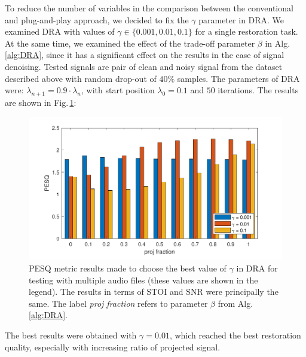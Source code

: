 \documentclass[conference]{IEEEtran}
\newcommand{\todo}[1]{\textcolor{red}{#1}}
\begin{document}
To reduce the number of variables in the comparison between the conventional and plug-and-play approach, we decided to fix the $\gamma$ parameter in DRA.
We examined DRA with values of $\gamma\in\{0.001, 0.01,0.1\}$ for a single restoration task.
At the same time, we examined the effect of the trade-off parameter $\beta$ in Alg.\,\ref{alg:DRA}, since it has a significant effect on the results in the case of signal denoising. 
Tested signals are pair of clean and noisy signal from the dataset described above with random drop-out of $40\%$ samples.
The parameters of DRA were: $\lambda_{n+1}=0.9\cdot\lambda_{n}$, with start position $\lambda_0=0.1$ and $50$ iterations. 
The results are shown in Fig.\,\ref{fig:gammatest}:

\begin{figure}[h]
	\includegraphics[width=1\linewidth]{figures/gamma_test}
	\caption{PESQ metric results made to choose the best value of $\gamma$ in DRA for testing with multiple audio files (these values are shown in the legend). %
	The results in terms of STOI and SNR were principally the same.
	The label \textit{proj fraction} refers to parameter $\beta$ from Alg.\,\ref{alg:DRA}.}
	\label{fig:gammatest}
\end{figure}

The best results were obtained with $\gamma=0.01$, which reached the best restoration quality, especially with increasing ratio of projected signal.
\end{document}
